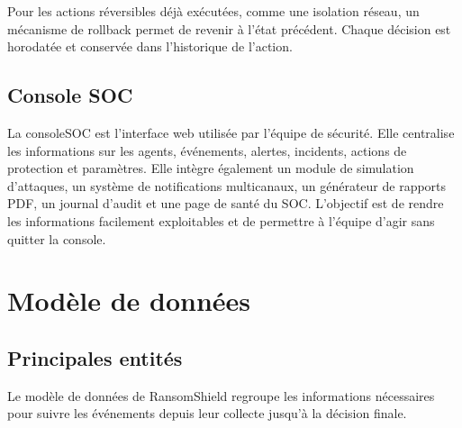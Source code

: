 Pour les actions réversibles déjà exécutées, comme une isolation réseau, un mécanisme de rollback permet de revenir à l'état précédent. Chaque décision est horodatée et conservée dans l'historique de l'action.

\subsection{Console SOC}

La \gls{consoleSOC} est l'interface web utilisée par l'équipe de sécurité. Elle centralise les informations sur les agents, événements, alertes, incidents, actions de protection et paramètres. Elle intègre également un module de simulation d'attaques, un système de notifications multicanaux, un générateur de rapports PDF, un journal d'audit et une page de santé du SOC. L'objectif est de rendre les informations facilement exploitables et de permettre à l'équipe d'agir sans quitter la console.

\section{Modèle de données}

\subsection{Principales entités}

Le modèle de données de RansomShield regroupe les informations nécessaires pour suivre les événements depuis leur collecte jusqu'à la décision finale.

